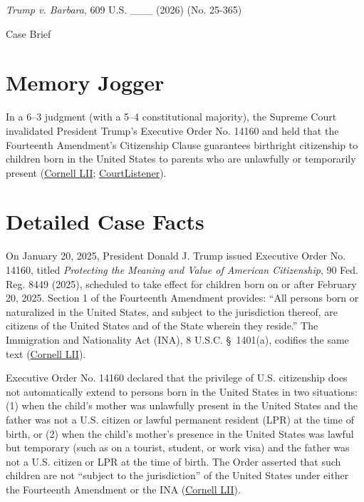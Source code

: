 \documentclass[12pt]{article}
\begin{document}
\begin{center}
{\LARGE \textit{Trump v. Barbara}, 609 U.S. \_\_\_ (2026) (No. 25-365)\par}
\vspace{0.8em}
{\large Case Brief\par}
\end{center}
\vspace{1em}

\section{Memory Jogger}
In a 6--3 judgment (with a 5--4 constitutional majority), the Supreme Court invalidated President Trump's Executive Order No. 14160 and held that the Fourteenth Amendment's Citizenship Clause guarantees birthright citizenship to children born in the United States to parents who are unlawfully or temporarily present (\href{https://www.law.cornell.edu/supremecourt/text/25-365}{Cornell LII}; \href{https://www.courtlistener.com/opinion/10883542/trump-v-barbara-revisions-70126/}{CourtListener}).

\section{Detailed Case Facts}
On January 20, 2025, President Donald J. Trump issued Executive Order No. 14160, titled \textit{Protecting the Meaning and Value of American Citizenship}, 90 Fed. Reg. 8449 (2025), scheduled to take effect for children born on or after February 20, 2025. Section 1 of the Fourteenth Amendment provides: ``All persons born or naturalized in the United States, and subject to the jurisdiction thereof, are citizens of the United States and of the State wherein they reside.'' The Immigration and Nationality Act (INA), 8 U.S.C. \S\ 1401(a), codifies the same text (\href{https://www.law.cornell.edu/supremecourt/text/25-365}{Cornell LII}).

Executive Order No. 14160 declared that the privilege of U.S. citizenship does not automatically extend to persons born in the United States in two situations: (1) when the child's mother was unlawfully present in the United States and the father was not a U.S. citizen or lawful permanent resident (LPR) at the time of birth, or (2) when the child's mother's presence in the United States was lawful but temporary (such as on a tourist, student, or work visa) and the father was not a U.S. citizen or LPR at the time of birth. The Order asserted that such children are not ``subject to the jurisdiction'' of the United States under either the Fourteenth Amendment or the INA (\href{https://www.law.cornell.edu/supremecourt/text/25-365}{Cornell LII}).
\end{document}
